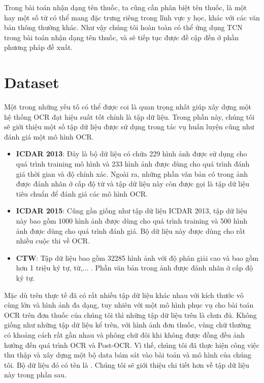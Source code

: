 Trong bài toán nhận dạng tên thuốc, ta cũng cần phân biệt tên thuốc, là một hay một số từ có thể mang đặc trưng riêng trong lĩnh vực y học, khác với các văn bản thông thường khác. Như vậy chúng tôi hoàn toàn có thể ứng dụng TCN trong bài toán nhận dạng tên thuốc, và sẽ tiếp tục được đề cập đến ở phần phương pháp đề xuất.

\section{Dataset}

Một trong những yếu tố có thể được coi là quan trọng nhất giúp xây dựng một hệ thống
OCR đạt hiệu suất tốt chính là tập dữ liệu. Trong phần này, chúng tôi sẽ giới thiệu một số
tập dữ liệu được sử dụng trong tác vụ huấn luyện cũng như đánh giá một mô hình OCR.
\begin{itemize}
    \item \textbf{ICDAR 2013}: Đây là bộ dữ liệu có chứa 229 hình ảnh được sử dụng cho quá trình
training mô hình và 233 hình ảnh được dùng cho quá trình đánh giá thời gian và độ
chính xác. Ngoài ra, những phần văn bản có trong ảnh được đánh nhãn ở cấp độ từ
và tập dữ liệu này còn được gọi là tập dữ liệu tiêu chuẩn để đánh giá các mô hình
OCR.
\item \textbf{ICDAR 2015}: Cũng gần giống như tập dữ liệu ICDAR 2013, tập dữ liệu này bao gồm
1000 hình ảnh được dùng cho quá trình training và 500 hình ảnh được dùng cho quá
trình đánh giá. Bộ dữ liệu này được dùng cho rất nhiều cuộc thi về OCR.
\item \textbf{CTW}: Tập dữ liệu bao gồm 32285 hình ảnh với độ phân giải cao và bao gồm hơn 1
triệu ký tự, từ,... . Phần văn bản trong ảnh được đánh nhãn ở cấp độ ký tự.
\end{itemize}
Mặc dù trên thực tế đã có rất nhiều tập dữ liệu khác nhau với kích thước vô cùng lớn và
hình ảnh đa dạng, tuy nhiên với một mô hình phục vụ cho bài toán OCR trên đơn thuốc của
chúng tôi thì những tập dữ liệu trên là chưa đủ. Không giống như những tập dữ liệu kể trên,
với hình ảnh đơn thuốc, vùng chữ thường có khoảng cách rất gần nhau và phông chữ đôi
khi không được đồng đều ảnh hưởng đến quá trình OCR và Post-OCR. Vì thế, chúng tôi đã
thực hiện công việc thu thập và xây dựng một bộ data bám sát vào bài toán và mô hình của
chúng tôi. Bộ dữ liệu đó có tên là . Chúng tôi sẽ giới thiệu chi tiết hơn
về tập dữ liệu này trong phần sau.